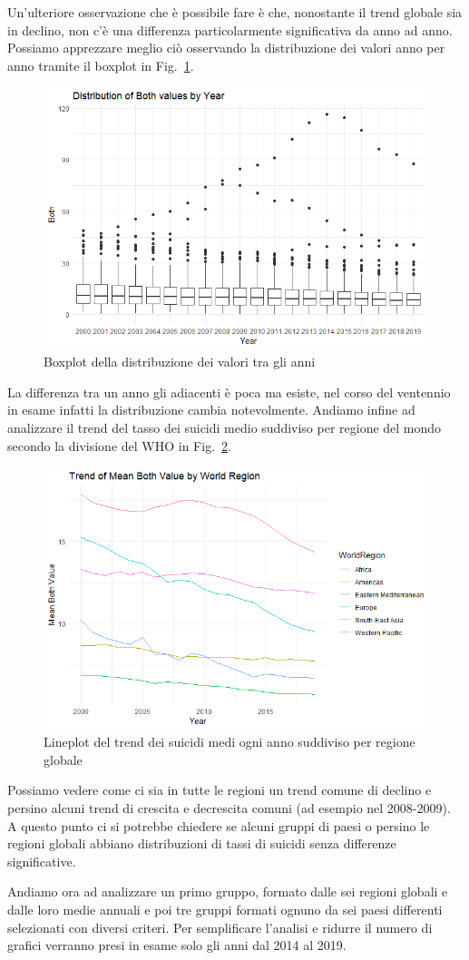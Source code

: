 \documentclass[conference]{IEEEtran}
\begin{document}
Un'ulteriore osservazione che è possibile fare è
che, nonostante il trend globale sia in declino, non c'è una differenza
particolarmente significativa da anno ad anno. Possiamo apprezzare meglio
ciò osservando la distribuzione dei valori anno per anno tramite il boxplot
in Fig.~\ref{3boxyears}.
\begin{figure}[htbp]
    \centerline{\includegraphics[width=.5\textwidth]{img/3 - Boxyears.png}}
    \caption{Boxplot della distribuzione dei valori tra gli anni}
    \label{3boxyears}
\end{figure}
La differenza tra un anno gli adiacenti è poca ma esiste, nel corso del ventennio
in esame infatti la distribuzione cambia notevolmente.
Andiamo infine ad analizzare il trend del tasso dei suicidi medio suddiviso
per regione del mondo secondo la divisione del WHO in Fig.~\ref{4wrtrend}.

\begin{figure}[htbp]
    \centerline{\includegraphics[width=.5\textwidth]{img/4 - WRTrend.png}}
    \caption{Lineplot del trend dei suicidi medi ogni anno suddiviso per regione globale}
    \label{4wrtrend}
\end{figure}

Possiamo vedere come ci sia in tutte le regioni un trend comune di declino e persino
alcuni trend di crescita e decrescita comuni (ad esempio nel 2008-2009).
A questo punto ci si potrebbe chiedere se alcuni gruppi
di paesi o persino le regioni globali abbiano
distribuzioni di tassi di suicidi senza differenze significative.

Andiamo ora ad analizzare
un primo gruppo, formato dalle sei regioni globali e dalle loro medie annuali
e poi tre gruppi formati ognuno da sei paesi differenti selezionati con diversi criteri.
Per semplificare l'analisi e ridurre il numero di grafici verranno presi in esame solo
gli anni dal 2014 al 2019.
\end{document}
